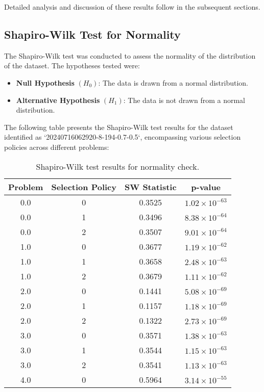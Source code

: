 \documentclass[12pt,a4paper]{article}
\begin{document}
Detailed analysis and discussion of these results follow in the subsequent sections.

\subsection{Shapiro-Wilk Test for Normality}
The Shapiro-Wilk test was conducted to assess the normality of the distribution of the dataset. The hypotheses tested were:

\begin{itemize}
    \item \textbf{Null Hypothesis} $(H_0)$: The data is drawn from a normal distribution.
    \item \textbf{Alternative Hypothesis} $(H_1)$: The data is not drawn from a normal distribution.
\end{itemize}

The following table presents the Shapiro-Wilk test results for the dataset identified as `20240716062920-8-194-0.7-0.5`, encompassing various selection policies across different problems:

\begin{table}[htbp]
\centering
\begin{tabular}{cccc}
\toprule
\textbf{Problem} & \textbf{Selection Policy} & \textbf{SW Statistic} & \textbf{p-value} \\
\midrule
0.0 & 0 & 0.3525 & $1.02 \times 10^{-63}$ \\
0.0 & 1 & 0.3496 & $8.38 \times 10^{-64}$ \\
0.0 & 2 & 0.3507 & $9.01 \times 10^{-64}$ \\
1.0 & 0 & 0.3677 & $1.19 \times 10^{-62}$ \\
1.0 & 1 & 0.3658 & $2.48 \times 10^{-63}$ \\
1.0 & 2 & 0.3679 & $1.11 \times 10^{-62}$ \\
2.0 & 0 & 0.1441 & $5.08 \times 10^{-69}$ \\
2.0 & 1 & 0.1157 & $1.18 \times 10^{-69}$ \\
2.0 & 2 & 0.1322 & $2.73 \times 10^{-69}$ \\
3.0 & 0 & 0.3571 & $1.38 \times 10^{-63}$ \\
3.0 & 1 & 0.3544 & $1.15 \times 10^{-63}$ \\
3.0 & 2 & 0.3541 & $1.13 \times 10^{-63}$ \\
4.0 & 0 & 0.5964 & $3.14 \times 10^{-55}$ \\
\bottomrule
\end{tabular}
\caption{Shapiro-Wilk test results for normality check.}
\label{tab:shapiro_wilk}
\end{table}
\end{document}
